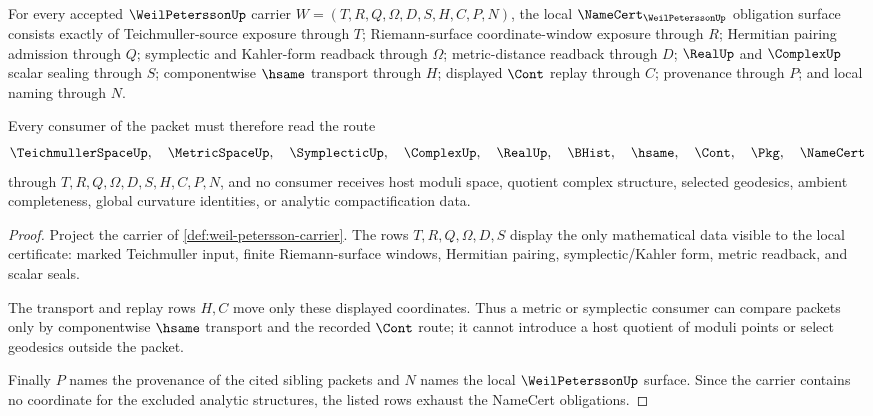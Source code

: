 \begin{theorem}
\label{thm:weil-petersson-namecert-obligations}
For every accepted $\WeilPeterssonUp$ carrier $W=(T,R,Q,\Omega,D,S,H,C,P,N)$, the local $\NameCert_{\WeilPeterssonUp}$ obligation surface consists exactly of Teichmuller-source exposure through $T$; Riemann-surface coordinate-window exposure through $R$; Hermitian pairing admission through $Q$; symplectic and Kahler-form readback through $\Omega$; metric-distance readback through $D$; $\RealUp$ and $\ComplexUp$ scalar sealing through $S$; componentwise $\hsame$ transport through $H$; displayed $\Cont$ replay through $C$; provenance through $P$; and local naming through $N$.

Every consumer of the packet must therefore read the route
$$
\TeichmullerSpaceUp,\quad \MetricSpaceUp,\quad \SymplecticUp,\quad \ComplexUp,\quad \RealUp,\quad \BHist,\quad \hsame,\quad \Cont,\quad \Pkg,\quad \NameCert
$$
through $T,R,Q,\Omega,D,S,H,C,P,N$, and no consumer receives host moduli space, quotient complex structure, selected geodesics, ambient completeness, global curvature identities, or analytic compactification data.
\end{theorem}
\begin{proof}
Project the carrier of \autoref{def:weil-petersson-carrier}. The rows $T,R,Q,\Omega,D,S$ display the only mathematical data visible to the local certificate: marked Teichmuller input, finite Riemann-surface windows, Hermitian pairing, symplectic/Kahler form, metric readback, and scalar seals.

The transport and replay rows $H,C$ move only these displayed coordinates. Thus a metric or symplectic consumer can compare packets only by componentwise $\hsame$ transport and the recorded $\Cont$ route; it cannot introduce a host quotient of moduli points or select geodesics outside the packet.

Finally $P$ names the provenance of the cited sibling packets and $N$ names the local $\WeilPeterssonUp$ surface. Since the carrier contains no coordinate for the excluded analytic structures, the listed rows exhaust the NameCert obligations.
\end{proof}



